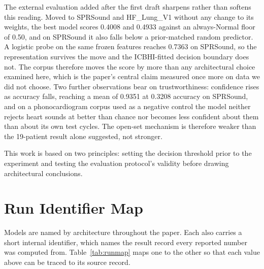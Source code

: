\documentclass[journal,onecolumn]{IEEEtran}
\newif\ifshownew
\newcommand{\added}[1]{\ifshownew\ul{#1}\else#1\fi}
\newenvironment{addedblock}{}{}
\begin{document}
\begin{addedblock}
\added{%
The external evaluation added after the first draft sharpens rather than softens this reading.
Moved to SPRSound and HF\_Lung\_V1 without any change to its weights, the best model scores
0.4008 and 0.4933 against an always-Normal floor of 0.50, and on SPRSound it also falls below a
prior-matched random predictor. A logistic probe on the same frozen features reaches 0.7363 on
SPRSound, so the representation survives the move and the ICBHI-fitted decision boundary does
not. The corpus therefore moves the score by more than any architectural choice examined here,
which is the paper's central claim measured once more on data we did not choose. Two further
observations bear on trustworthiness: confidence rises as accuracy falls, reaching a mean of
0.9351 at 0.3208 accuracy on SPRSound, and on a phonocardiogram corpus used as a negative
control the model neither rejects heart sounds at better than chance nor becomes less confident
about them than about its own test cycles. The open-set mechanism is therefore weaker than the
19-patient result alone suggested, not stronger.%
}
\end{addedblock}

This work is based on two principles: setting the decision threshold prior to the experiment and testing the evaluation protocol's validity before drawing architectural conclusions.

\appendices
\section{Run Identifier Map}
\label{app:runmap}

Models are named by architecture throughout the paper. Each also carries a short internal
identifier, which names the result record every reported number was computed from.
Table~\ref{tab:runmap} maps one to the other so that each value above can be traced to its
source record.
\end{document}
